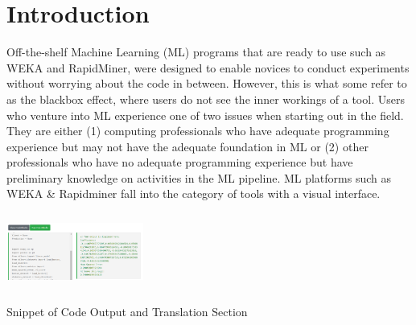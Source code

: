 \documentclass{sigchi-ext}
\begin{document}




\section{Introduction}
Off-the-shelf Machine Learning (ML) programs that are ready to use such as WEKA and RapidMiner, were designed to enable novices to conduct experiments without worrying about the code in between. However, this is what some refer to as the blackbox effect, where users do not see the inner workings of a tool. Users who venture into ML experience one of two issues when starting out in the field. They are either (1) computing professionals who have adequate programming experience but may not have the adequate foundation in ML or (2) other professionals who have no adequate programming experience but have preliminary knowledge on activities in the ML pipeline. ML platforms such as WEKA \& Rapidminer fall into the category of tools with a visual interface. 

\begin{marginfigure}[-7.5pc]
\begin{minipage}{\marginparwidth}
     \centering
    \includegraphics[width=4.5cm,height=2.5cm]{figures/Code_Output.png}
    \caption{Snippet of Code Output and Translation Section}
    \label{fig:Code_output}
    \end{minipage}
\end{marginfigure}
\end{document}
